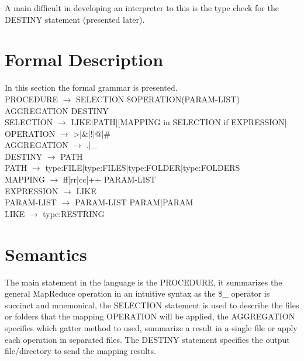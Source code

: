 \documentclass{article}
\begin{document}
A main difficult in developing an interpreter to this is the type
check for the DESTINY statement (presented later).

\section{Formal Description}
In this section the formal grammar is presented.
\\

PROCEDURE $\rightarrow$ SELECTION \$OPERATION(PARAM-LIST) AGGREGATION DESTINY
\\

SELECTION $\rightarrow$ LIKE|PATH|[MAPPING in SELECTION if EXPRESSION]
\\

OPERATION $\rightarrow$ >|\&|!|@|\#
\\

AGGREGATION $\rightarrow$ .|\_
\\

DESTINY $\rightarrow$ PATH
\\

PATH $\rightarrow$ type:FILE|type:FILES|type:FOLDER|type:FOLDERS
\\

MAPPING $\rightarrow$ ff|rr|cc|++ PARAM-LIST
\\

EXPRESSION $\rightarrow$ LIKE
\\

PARAM-LIST $\rightarrow$ PARAM-LIST PARAM|PARAM
\\

LIKE $\rightarrow$ type:RESTRING

\section{Semantics}
The main statement in the language is the PROCEDURE, it summarizes the
general MapReduce operation in an intuitive syntax as the \$\_ operator is
succinct and mnemonical, the SELECTION statement is used to describe the
files or folders that the mapping OPERATION will be applied, the
AGGREGATION specifies which gatter method to used, summarize a result in
a single file or apply each operation in separated files. The DESTINY
statement specifies the output file/directory to send the mapping results.
\end{document}
